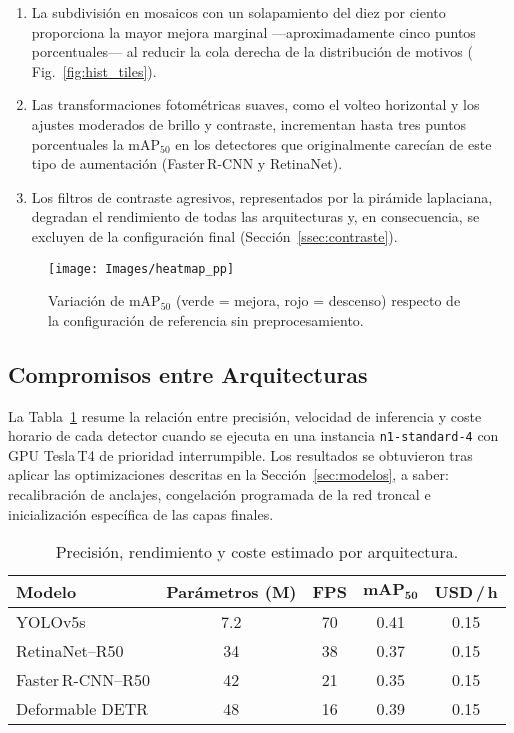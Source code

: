 \begin{enumerate}
  \item La subdivisión en mosaicos con un solapamiento del diez por ciento proporciona la mayor mejora marginal —aproximadamente cinco puntos porcentuales— al reducir la cola derecha de la distribución de motivos (\(\)Fig.~\ref{fig:hist_tiles}).
  \item Las transformaciones fotométricas suaves, como el volteo horizontal y los ajustes moderados de brillo y contraste, incrementan hasta tres puntos porcentuales la \(\text{mAP}_{50}\) en los detectores que originalmente carecían de este tipo de aumentación (Faster\,R-CNN y RetinaNet).
  \item Los filtros de contraste agresivos, representados por la pirámide laplaciana, degradan el rendimiento de todas las arquitecturas y, en consecuencia, se excluyen de la configuración final (Sección~\ref{ssec:contraste}).
\end{enumerate}

\begin{figure}[htpb]
  \centering
  \texttt{[image: Images/heatmap\_pp]}
  \caption{Variación de \(\text{mAP}_{50}\) (verde = mejora, rojo = descenso) respecto de la configuración de referencia sin preprocesamiento.}
  \label{fig:heatmap_pp}
\end{figure}

\subsection{Compromisos entre Arquitecturas}\label{ssec:tradeoffs}

La Tabla~\ref{tab:tradeoff} resume la relación entre precisión, velocidad de inferencia y coste horario de cada detector cuando se ejecuta en una instancia \texttt{n1-standard-4} con GPU Tesla\,T4 de prioridad interrumpible.
Los resultados se obtuvieron tras aplicar las optimizaciones descritas en la Sección~\ref{sec:modelos}, a saber: recalibración de anclajes, congelación programada de la red troncal e inicialización específica de las capas finales.

\begin{table}[htpb]
  \centering
  \caption{Precisión, rendimiento y coste estimado por arquitectura.}
  \label{tab:tradeoff}
  \begin{tabular}{|l|c|c|c|c|}
    \hline
    \textbf{Modelo} & \textbf{Parámetros (M)} & \textbf{FPS\footnotemark} & \(\mathbf{mAP_{50}}\) & \textbf{USD\,/\,h\footnotemark} \\ \hline
    YOLOv5s          & 7.2  & 70 & 0.41 & 0.15 \\ \hline
    RetinaNet–R50    & 34   & 38 & 0.37 & 0.15 \\ \hline
    Faster\,R-CNN–R50 & 42   & 21 & 0.35 & 0.15 \\ \hline
    Deformable DETR  & 48   & 16 & 0.39 & 0.15 \\ \hline
  \end{tabular}
\end{table}

